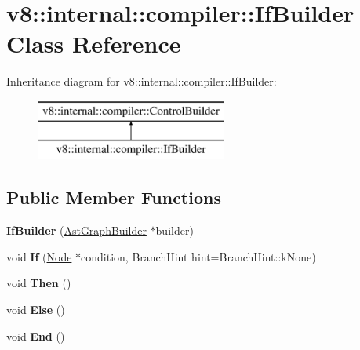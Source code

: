 \hypertarget{classv8_1_1internal_1_1compiler_1_1_if_builder}{}\section{v8\+:\+:internal\+:\+:compiler\+:\+:If\+Builder Class Reference}
\label{classv8_1_1internal_1_1compiler_1_1_if_builder}
Inheritance diagram for v8\+:\+:internal\+:\+:compiler\+:\+:If\+Builder\+:\begin{figure}[H]
\begin{center}
\leavevmode
\includegraphics[height=2.000000cm]{classv8_1_1internal_1_1compiler_1_1_if_builder}
\end{center}
\end{figure}
\subsection*{Public Member Functions}
\begin{DoxyCompactItemize}
\item 
{\bfseries If\+Builder} (\hyperlink{classv8_1_1internal_1_1compiler_1_1_ast_graph_builder}{Ast\+Graph\+Builder} $\ast$builder)\hypertarget{classv8_1_1internal_1_1compiler_1_1_if_builder_a076b7dc01c6393e914f96ddca948d564}{}\label{classv8_1_1internal_1_1compiler_1_1_if_builder_a076b7dc01c6393e914f96ddca948d564}

\item 
void {\bfseries If} (\hyperlink{classv8_1_1internal_1_1compiler_1_1_node}{Node} $\ast$condition, Branch\+Hint hint=Branch\+Hint\+::k\+None)\hypertarget{classv8_1_1internal_1_1compiler_1_1_if_builder_a319265bfd1f4d3b9572eaa1778d8cc73}{}\label{classv8_1_1internal_1_1compiler_1_1_if_builder_a319265bfd1f4d3b9572eaa1778d8cc73}

\item 
void {\bfseries Then} ()\hypertarget{classv8_1_1internal_1_1compiler_1_1_if_builder_a41011780821d9b55a2c6eb47f2c6926e}{}\label{classv8_1_1internal_1_1compiler_1_1_if_builder_a41011780821d9b55a2c6eb47f2c6926e}

\item 
void {\bfseries Else} ()\hypertarget{classv8_1_1internal_1_1compiler_1_1_if_builder_a0c9ea87f68d7ea87317d71ee1f153a62}{}\label{classv8_1_1internal_1_1compiler_1_1_if_builder_a0c9ea87f68d7ea87317d71ee1f153a62}

\item 
void {\bfseries End} ()\hypertarget{classv8_1_1internal_1_1compiler_1_1_if_builder_a67e738609be719b8f68e82ff0e90d73a}{}\label{classv8_1_1internal_1_1compiler_1_1_if_builder_a67e738609be719b8f68e82ff0e90d73a}

\end{DoxyCompactItemize}
